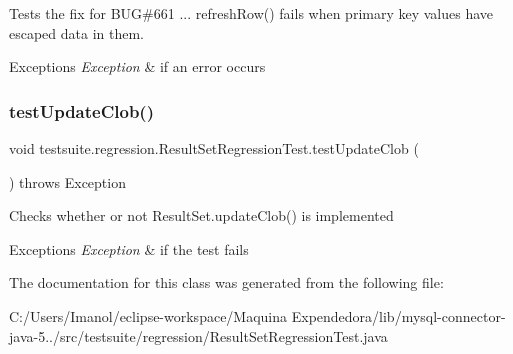 Tests the fix for B\+UG\#661 ... refresh\+Row() fails when primary key values have escaped data in them.


\begin{DoxyExceptions}{Exceptions}
{\em Exception} & if an error occurs \\
\hline
\end{DoxyExceptions}
\mbox{\label{classtestsuite_1_1regression_1_1_result_set_regression_test_a996b8a0a196360051ed54e9ccc044c92}} 
\subsubsection{\texorpdfstring{test\+Update\+Clob()}{testUpdateClob()}}
{\footnotesize\ttfamily void testsuite.\+regression.\+Result\+Set\+Regression\+Test.\+test\+Update\+Clob (\begin{DoxyParamCaption}{ }\end{DoxyParamCaption}) throws Exception}

Checks whether or not Result\+Set.\+update\+Clob() is implemented


\begin{DoxyExceptions}{Exceptions}
{\em Exception} & if the test fails \\
\hline
\end{DoxyExceptions}


The documentation for this class was generated from the following file\+:\begin{DoxyCompactItemize}
\item 
C\+:/\+Users/\+Imanol/eclipse-\/workspace/\+Maquina Expendedora/lib/mysql-\/connector-\/java-\/5../src/testsuite/regression/Result\+Set\+Regression\+Test.\+java\end{DoxyCompactItemize}
